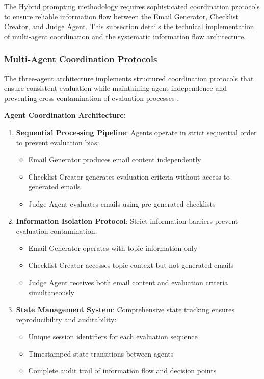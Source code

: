The Hybrid prompting methodology requires sophisticated coordination protocols to ensure reliable information flow between the Email Generator, Checklist Creator, and Judge Agent. This subsection details the technical implementation of multi-agent coordination and the systematic information flow architecture.

\subsubsection{Multi-Agent Coordination Protocols}

The three-agent architecture implements structured coordination protocols that ensure consistent evaluation while maintaining agent independence and preventing cross-contamination of evaluation processes \cite{grötschla2025agentsnet}.

\textbf{Agent Coordination Architecture:}
\begin{enumerate}
    \item \textbf{Sequential Processing Pipeline}: Agents operate in strict sequential order to prevent evaluation bias:
    \begin{itemize}
        \item Email Generator produces email content independently
        \item Checklist Creator generates evaluation criteria without access to generated emails
        \item Judge Agent evaluates emails using pre-generated checklists
    \end{itemize}
    
    \item \textbf{Information Isolation Protocol}: Strict information barriers prevent evaluation contamination:
    \begin{itemize}
        \item Email Generator operates with topic information only
        \item Checklist Creator accesses topic context but not generated emails
        \item Judge Agent receives both email content and evaluation criteria simultaneously
    \end{itemize}
    
    \item \textbf{State Management System}: Comprehensive state tracking ensures reproducibility and auditability:
    \begin{itemize}
        \item Unique session identifiers for each evaluation sequence
        \item Timestamped state transitions between agents
        \item Complete audit trail of information flow and decision points
    \end{itemize}
\end{enumerate}

